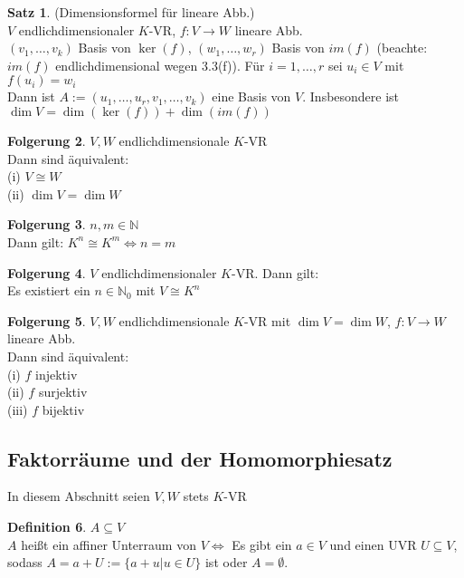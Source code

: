 \documentclass[10pt,a4paper,numbers=endperiod]{scrartcl}
\theoremstyle{definition}
\newtheorem{satz}{Satz}[section]
\newtheorem{defi}[satz]{Definition}
\newtheorem{folg}[satz]{Folgerung}
\def\NN{{\mathbb N}}
\begin{document}
\begin{satz}
	(Dimensionsformel für lineare Abb.)\\
	$V$ endlichdimensionaler $K$-VR, $f:V \rightarrow W$ lineare Abb.\\
	$(v_1,\ldots,v_k)$ Basis von $\ker(f)$, $(w_1,\ldots,w_r)$ Basis von $im(f)$ (beachte: $im(f)$ endlichdimensional wegen 3.3(f)). Für $i=1,\ldots,r$ sei $u_i \in V$ mit $f(u_i)= w_i$\\
	Dann ist $A := (u_1,\ldots,u_r,v_1,\ldots,v_k)$ eine Basis von $V$. Insbesondere ist $\dim V = \dim(\ker(f))+\dim(im(f))$
\end{satz}

\begin{folg}
	$V,W$ endlichdimensionale $K$-VR\\
	Dann sind äquivalent:\\
	(i) $V \cong W$\\
	(ii) $\dim V = \dim W$
\end{folg}

\begin{folg}
	$n,m \in \NN$\\
	Dann gilt: $K^n \cong K^m \Leftrightarrow n = m$
\end{folg}

\begin{folg}
	$V$ endlichdimensionaler $K$-VR. Dann gilt:\\
	Es existiert ein $n \in \NN_0$ mit $V\cong K^n$
\end{folg}

\begin{folg}
	$V,W$ endlichdimensionale $K$-VR mit $\dim V = \dim W$, $f: V \rightarrow W$ lineare Abb.\\
	Dann sind äquivalent:\\ 
	(i) $f$ injektiv\\
	(ii) $f$ surjektiv\\
	(iii) $f$ bijektiv
\end{folg}

\subsection{Faktorräume und der Homomorphiesatz}
In diesem Abschnitt seien $V,W$ stets $K$-VR

\begin{defi}
	$A \subseteq V$\\
	$A$ heißt ein affiner Unterraum von $V \Leftrightarrow$ Es gibt ein $a \in V$ und einen UVR $U \subseteq V$, sodass $A = a + U :=\{a+u| u \in U\}$ ist oder $A= \emptyset$.
\end{defi}
\end{document}
